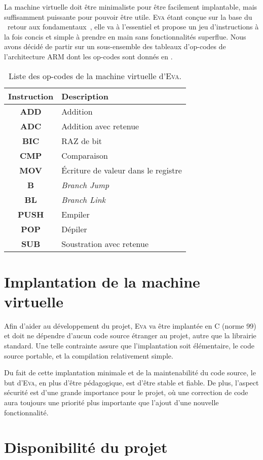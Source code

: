 \documentclass[11pt,twoside,french]{article}
\makeatletter
\providecommand{\og}{\leavevmode\flqq~}%
\providecommand{\fg}{\ifdim\lastskip>\z@\unskip\fi~\frqq}%
\newcommand{\noun}[1]{\textsc{#1}}
\makeatother
\begin{document}
La machine virtuelle doit être minimaliste pour être facilement implantable,
mais suffisamment puissante pour pouvoir être utile. \noun{Eva} étant
conçue sur la base du \og retour aux fondamentaux\fg , elle va à l'essentiel
et propose un jeu d'instructions à la fois concis et simple à prendre
en main sans fonctionnalités superflue. Nous avons décidé de partir
sur un sous-ensemble des tableaux d'op-codes de l'architecture ARM
dont les op-codes sont donnés en .
\begin{table}[bp]
\begin{centering}
\begin{tabular}{|c|l|}
\hline
\textbf{Instruction} & \textbf{Description}\tabularnewline
\hline
\hline
\textbf{ADD} & Addition\tabularnewline
\hline
\textbf{ADC} & Addition avec retenue\tabularnewline
\hline
\textbf{BIC} & RAZ de bit\tabularnewline
\hline
\textbf{CMP} & Comparaison\tabularnewline
\hline
\textbf{MOV} & Écriture de valeur dans le registre\tabularnewline
\hline
\textbf{B} & \emph{Branch Jump}\tabularnewline
\hline
\textbf{BL} & \emph{Branch Link}\tabularnewline
\hline
\textbf{PUSH} & Empiler\tabularnewline
\hline
\textbf{POP} & Dépiler\tabularnewline
\hline
\textbf{SUB} & Soustration avec retenue\tabularnewline
\hline
\end{tabular}
\par\end{centering}
\caption{\label{tab:opcodes}Liste des op-codes de la machine virtuelle d'\noun{Eva}.}
\end{table}


\section{Implantation de la machine virtuelle}

Afin d'aider au développement du projet, \noun{Eva} va être implantée
en C (norme 99) et doit ne dépendre d'aucun code source étranger au
projet, autre que la librairie standard. Une telle contrainte assure
que l'implantation soit élémentaire, le code source portable, et la
compilation relativement simple.

Du fait de cette implantation minimale et de la maintenabilité du
code source, le but d'\noun{Eva}, en plus d'être pédagogique, est
d'être stable et fiable. De plus, l'aspect sécurité est d'une grande
importance pour le projet, où une correction de code aura toujours
une priorité plus importante que l'ajout d'une nouvelle fonctionnalité.

\section{Disponibilité du projet}
\end{document}
